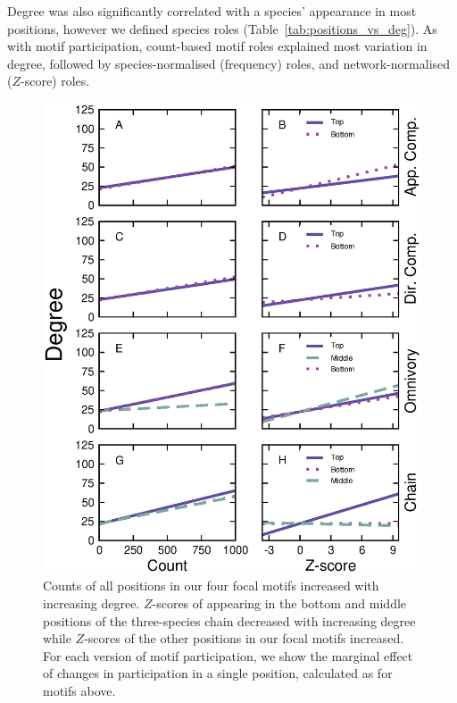 \documentclass[12pt]{article}
\begin{document}
\begin{spacing}{2.0}
            Degree was also significantly correlated with a species' appearance in most positions, however we defined species roles (Table~\ref{tab:positions_vs_deg}).
            As with motif participation, count-based motif roles explained most variation in degree, followed by species-normalised (frequency) roles, and network-normalised ($Z$-score) roles.


		    \begin{figure}[ht!]
		        \centering
		        \includegraphics[height=\.75\textheight]{figures/positions_vs_Deg_countZ.eps}
		        \caption{Counts of all positions in our four focal motifs increased with increasing degree. $Z$-scores of appearing in the bottom and middle positions of the three-species chain decreased with increasing degree while $Z$-scores of the other positions in our focal motifs increased. For each version of motif participation, we show the marginal effect of changes in participation in a single position, calculated as for motifs above.}
		        \label{fig:positions_deg}
		    \end{figure}



\end{spacing}
\end{document}
